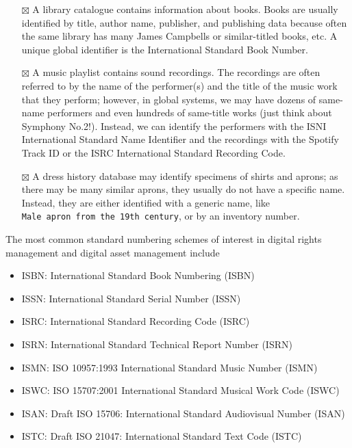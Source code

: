 \documentclass[
  letterpaper,
  DIV=11,
  numbers=noendperiod]{scrreprt}
\providecommand{\tightlist}{%
  \setlength{\itemsep}{0pt}\setlength{\parskip}{0pt}}\usepackage{longtable,booktabs,array}
\begin{document}
\begin{itemize}
\item[$\boxtimes$]
  A library catalogue contains information about books. Books are
  usually identified by title, author name, publisher, and publishing
  data because often the same library has many James Campbells or
  similar-titled books, etc. A unique global identifier is the
  International Standard Book Number.
\item[$\boxtimes$]
  A music playlist contains sound recordings. The recordings are often
  referred to by the name of the performer(s) and the title of the music
  work that they perform; however, in global systems, we may have dozens
  of same-name performers and even hundreds of same-title works (just
  think about Symphony No.2!). Instead, we can identify the performers
  with the ISNI International Standard Name Identifier and the
  recordings with the Spotify Track ID or the ISRC International
  Standard Recording Code.
\item[$\boxtimes$]
  A dress history database may identify specimens of shirts and aprons;
  as there may be many similar aprons, they usually do not have a
  specific name. Instead, they are either identified with a generic
  name, like \texttt{Male\ apron\ from\ the\ 19th\ century}, or by an
  inventory number.
\end{itemize}

\begin{tcolorbox}[enhanced jigsaw, opacityback=0, bottomrule=.15mm, rightrule=.15mm, toptitle=1mm, breakable, colbacktitle=quarto-callout-note-color!10!white, colback=white, title=\textcolor{quarto-callout-note-color}{\faInfo}\hspace{0.5em}{Note}, leftrule=.75mm, toprule=.15mm, left=2mm, arc=.35mm, colframe=quarto-callout-note-color-frame, coltitle=black, titlerule=0mm, bottomtitle=1mm, opacitybacktitle=0.6]

The most common standard numbering schemes of interest in digital rights
management and digital asset management include

\begin{itemize}
\tightlist
\item
  ISBN: International Standard Book Numbering (ISBN)
\item
  ISSN: International Standard Serial Number (ISSN)
\item
  ISRC: International Standard Recording Code (ISRC)
\item
  ISRN: International Standard Technical Report Number (ISRN)
\item
  ISMN: ISO 10957:1993 International Standard Music Number (ISMN)
\item
  ISWC: ISO 15707:2001 International Standard Musical Work Code (ISWC)
\item
  ISAN: Draft ISO 15706: International Standard Audiovisual Number
  (ISAN)
\item
  ISTC: Draft ISO 21047: International Standard Text Code (ISTC)
\end{itemize}

\end{tcolorbox}
\end{document}
